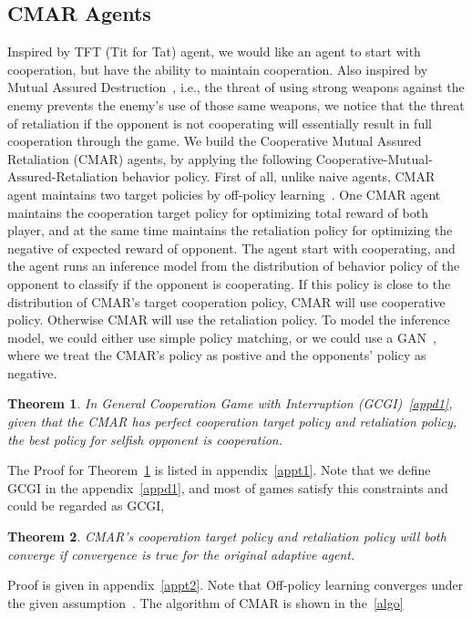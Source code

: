 \documentclass{article}
\newtheorem{theorem}{Theorem}
\begin{document}
\subsection{CMAR Agents}
Inspired by TFT (Tit for Tat) agent, we would like an agent to start with cooperation,
but have the ability to maintain cooperation.
Also inspired by Mutual Assured Destruction~\cite{ni2014mutually},
i.e., the threat of using strong weapons against the enemy
prevents the enemy's use of those same weapons,
we notice that the threat of retaliation if the opponent is not cooperating will
essentially result in full cooperation through the game.
We build the Cooperative Mutual Assured Retaliation (CMAR) agents,
by applying the following Cooperative-Mutual-Assured-Retaliation behavior policy.
First of all, unlike naive agents,
CMAR agent maintains two target policies by off-policy learning~\cite{precup2001off}.
One CMAR agent maintains the cooperation target policy for optimizing total reward of both player,
and at the same time
maintains the retaliation policy for optimizing the negative of expected reward of opponent.
The agent start with cooperating,
and the agent runs an inference model from the distribution of behavior policy
of the opponent to classify if the opponent is cooperating.
If this policy is close to the distribution of CMAR's target cooperation policy,
CMAR will use cooperative policy.
Otherwise CMAR will use the retaliation policy.
To model the inference model, we could either use simple policy matching,
or we could use a GAN~\cite{goodfellow2014generative},
where we treat the CMAR's policy as postive and the opponents' policy as negative.

\begin{theorem}\label{t1}
    In General Cooperation Game with Interruption (GCGI)~\ref{appd1},
    given that the CMAR has perfect cooperation target policy and retaliation policy,
    the best policy for selfish opponent is cooperation.
\end{theorem}
The Proof for Theorem~\ref{t1} is listed in appendix~\ref{appt1}.
Note that we define GCGI in the appendix~\ref{appd1},
and most of games satisfy this constraints and could be regarded as GCGI,

\begin{theorem}\label{t2}
    CMAR's cooperation target policy and retaliation policy will both converge if convergence is true for the original adaptive agent.
\end{theorem}
Proof is given in appendix~\ref{appt2}.
Note that Off-policy learning converges under the given assumption~\cite{precup2001off}.
The algorithm of CMAR is shown in the~\ref{algo}
\end{document}
